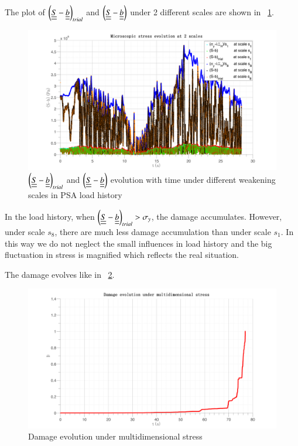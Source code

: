 \documentclass[3p,times,number,review]{elsarticle}
\newcommand{\figref}[1]{\figurename~\ref{#1}}
\begin{document}
 The plot of $\left( \uline{\uline{S}}-\uline{\uline{b}}\right)_{trial}$ and $\left( \uline{\uline{S}}-\uline{\uline{b}}\right)$ under 2 different scales are shown in \figref{trialreal3d}.
\begin{figure}[!h]
	\centering
	\includegraphics[width=\textwidth]{figures//trialreal3d.png} 
	\caption{$\left( \uline{\uline{S}}-\uline{\uline{b}}\right)_{trial}$ and $\left( \uline{\uline{S}}-\uline{\uline{b}}\right)$ evolution with time under different weakening scales in PSA load history}
	\label{trialreal3d}
\end{figure} 



In the load history, when $\left( \uline{\uline{S}}-\uline{\uline{b}}\right)_{trial}>\sigma_y$, the damage accumulates. However, under scale $s_{8}$, there are much less damage accumulation than under scale $s_1$.  In this way we do not neglect the small influences in load history and the big fluctuation in stress is magnified which reflects the real situation. 

The damage evolves like in \figref{dam3d}. 


\begin{figure}[!h]
	\centering
	\includegraphics[width=\textwidth]{figures//damage3d.png} 
	\caption{Damage evolution under multidimensional stress}
	\label{dam3d}
\end{figure}
\end{document}
